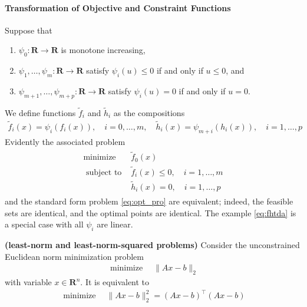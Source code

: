 \documentclass{article}
\newcommand{\bfs}[1]{\textbf{({#1}) }}
\begin{document}
\paragraph{Transformation of Objective and Constraint Functions}\label{sec:kdzmfe}
Suppose that 
\begin{enumerate}
    \item $\psi_{0}: \mathbf{R} \rightarrow \mathbf{R}$ is monotone increasing, 
    \item $\psi_{1}, \ldots, \psi_{m}: \mathbf{R} \rightarrow \mathbf{R}$ satisfy $\psi_{i}(u) \leq 0$ if and only if $u \leq 0$, and 
    \item $\psi_{m+1}, \ldots, \psi_{m+p}: \mathbf{R} \rightarrow \mathbf{R}$ satisfy $\psi_{i}(u)=0$ if and only if $u=0 .$
\end{enumerate}  We define functions $\tilde{f}_{i}$ and $\tilde{h}_{i}$ as the compositions
\begin{align*}
\tilde{f}_{i}(x)=\psi_{i}\left(f_{i}(x)\right), \quad i=0, \ldots, m, \quad \tilde{h}_{i}(x)=\psi_{m+i}\left(h_{i}(x)\right), \quad i=1, \ldots, p
\end{align*}
Evidently the associated problem
\begin{align}
\begin{array}{ll}
\operatorname{minimize} & \tilde{f}_{0}(x) \\
\text { subject to } & \tilde{f}_{i}(x) \leq 0, \quad i=1, \ldots, m \\
& \tilde{h}_{i}(x)=0, \quad i=1, \ldots, p
\end{array}\label{eq:bnuqe}
\end{align}
and the standard form problem \cref{eq:opt_pro} are equivalent; indeed, the feasible sets are identical, and the optimal points are identical. The example \cref{eq:fhtda}  is a special case with all $\psi_{i}$ are linear.

\begin{exma}\bfs{least-norm and least-norm-squared problems}
 Consider the unconstrained Euclidean norm minimization problem
\begin{align*}
\operatorname{minimize} \quad\|A x-b\|_{2}
\end{align*}
with variable $x \in \mathbf{R}^{n} .$ It is equivalent to 
\begin{align*}
\operatorname{minimize} \quad\|A x-b\|_{2}^{2}=(A x-b)^{\top}(A x-b)
\end{align*}
\end{exma} 
\end{document}
